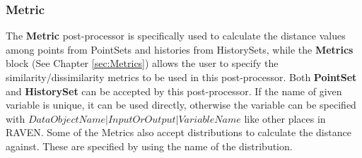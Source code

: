 
\subsubsection{Metric}
\label{MetricPP}
The \textbf{Metric} post-processor is specifically used to calculate the distance values among points from PointSets and histories from HistorySets,
while the \textbf{Metrics} block (See Chapter \ref{sec:Metrics}) allows the user to specify the similarity/dissimilarity metrics to be used in this
post-processor. Both \textbf{PointSet} and \textbf{HistorySet} can be accepted by this post-processor.
If the name of given variable is unique, it can be used directly, otherwise the variable can be specified
with $DataObjectName|InputOrOutput|VariableName$ like other places in RAVEN.
Some of the Metrics also accept distributions to calculate the distance against.
These are specified by using the name of the distribution.
%
%

